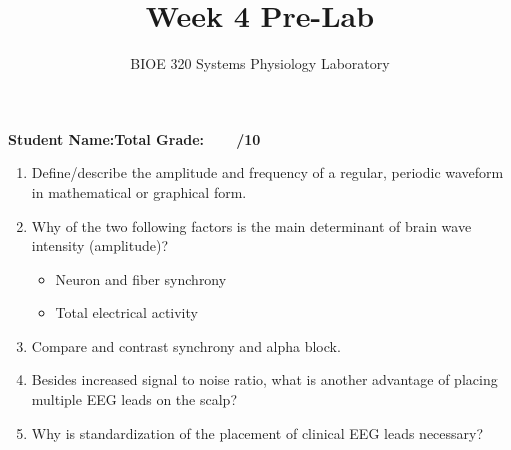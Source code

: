 \documentclass{article}
\title{Week 4 Pre-Lab}
\author{BIOE 320 Systems Physiology Laboratory}
\date{}
\begin{document}
\maketitle
\large

\textbf{Student Name:}\hfill 	\textbf{Total Grade:\ \ \ \ /10}\vspace{0.5cm}

\begin{enumerate}
	\item Define/describe the amplitude and frequency of a regular, periodic waveform in mathematical or graphical form.
	\item Why of the two following factors is the main determinant of brain wave intensity (amplitude)?
	\begin{itemize}
		\item Neuron and fiber synchrony
		\item Total electrical activity
	\end{itemize}
	
	\item Compare and contrast synchrony and alpha block.
	\item Besides increased signal to noise ratio, what is another advantage of placing multiple EEG leads on the scalp?
	\item Why is standardization of the placement of clinical EEG leads necessary?
\end{enumerate}
\end{document}
